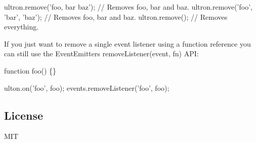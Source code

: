 \begin{DoxyCode}
ultron.remove('foo, bar baz');        // Removes foo, bar and baz.
ultron.remove('foo', 'bar', 'baz');   // Removes foo, bar and baz.
ultron.remove();                      // Removes everything.
\end{DoxyCode}


If you just want to remove a single event listener using a function reference you can still use the Event\+Emitter\textquotesingle{}s {\ttfamily remove\+Listener(event, fn)} A\+PI\+:


\begin{DoxyCode}
function foo() \{\}

ulton.on('foo', foo);
events.removeListener('foo', foo);
\end{DoxyCode}


\subsection*{License}

M\+IT 